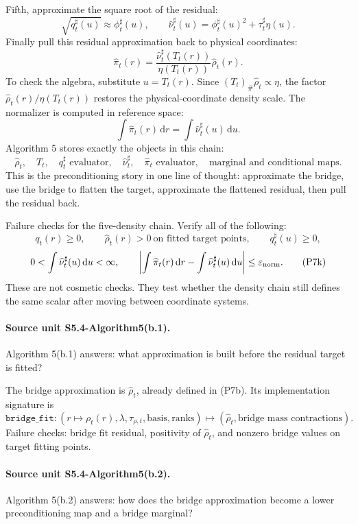 \documentclass[11pt]{article}
\newcommand{\dd}{\,\mathrm d}
\begin{document}
Fifth, approximate the square root of the residual:
\[
    \sqrt{q_t^\sharp(u)}\approx \phi_t^\sharp(u),
    \qquad
    \widehat\nu_t^\sharp(u)
    =
    \phi_t^\sharp(u)^2+\tau_t^\sharp\eta(u).
    \tag{P7f}
\]
Finally pull this residual approximation back to physical coordinates:
\[
    \widehat\pi_t(r)
    =
    \frac{\widehat\nu_t^\sharp(T_t(r))}
    {\eta(T_t(r))}
    \widehat\rho_t(r).
    \tag{P7g}
\]
To check the algebra, substitute \(u=T_t(r)\).  Since
\((T_t)_\#\widehat\rho_t\propto\eta\), the factor
\(\widehat\rho_t(r)/\eta(T_t(r))\) restores the physical-coordinate density
scale.  The normalizer is computed in reference space:
\[
    \int \widehat\pi_t(r)\dd r
    =
    \int \widehat\nu_t^\sharp(u)\dd u.
    \tag{P7h}
\]
Algorithm 5 stores exactly the objects in this chain:
\[
    \widehat\rho_t,\quad T_t,\quad q_t^\sharp\text{ evaluator},\quad
    \widehat\nu_t^\sharp,\quad \widehat\pi_t\text{ evaluator},\quad
    \text{marginal and conditional maps}.
    \tag{P7i}
\]
This is the preconditioning story in one line of thought: approximate the
bridge, use the bridge to flatten the target, approximate the flattened
residual, then pull the residual back.

Failure checks for the five-density chain.  Verify all of the following:
\[
    q_t(r)\ge0,\qquad
    \widehat\rho_t(r)>0\ \text{on fitted target points},\qquad
    q_t^\sharp(u)\ge0,
    \tag{P7j}
\]
\[
    0<\int\widehat\nu_t^\sharp(u)\dd u<\infty,\qquad
    \left|
    \int\widehat\pi_t(r)\dd r-\int\widehat\nu_t^\sharp(u)\dd u
    \right|
    \le \varepsilon_{\rm norm}.
    \tag{P7k}
\]
These are not cosmetic checks.  They test whether the density chain still
defines the same scalar after moving between coordinate systems.

\paragraph{Source unit S5.4-Algorithm5(b.1).}
Algorithm 5(b.1) answers: what approximation is built before the residual
target is fitted?

The bridge approximation is \(\widehat\rho_t\), already defined in (P7b).  Its
implementation signature is
\[
    \texttt{bridge\_fit}
    :
    (r\mapsto \rho_t(r),\lambda,\tau_{\rho,t},\text{basis},\text{ranks})
    \mapsto
    (\widehat\rho_t,\text{bridge mass contractions}).
    \tag{P7l}
\]
Failure checks: bridge fit residual, positivity of \(\widehat\rho_t\), and
nonzero bridge values on target fitting points.

\paragraph{Source unit S5.4-Algorithm5(b.2).}
Algorithm 5(b.2) answers: how does the bridge approximation become a lower
preconditioning map and a bridge marginal?
\end{document}
